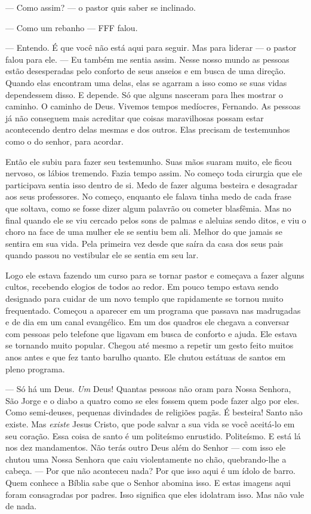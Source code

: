 --- Como assim? --- o pastor quis saber se inclinado.

--- Como um rebanho --- FFF falou.

--- Entendo. É que você não está aqui para seguir. Mas para liderar --- o pastor falou para ele. --- Eu também me sentia assim. Nesse nosso mundo as pessoas estão desesperadas pelo conforto de seus anseios e em busca de uma direção. Quando elas encontram uma delas, elas se agarram a isso como se suas vidas dependessem disso. E depende. Só que alguns nasceram para lhes mostrar o caminho. O caminho de Deus. Vivemos tempos medíocres, Fernando. As pessoas já não conseguem mais acreditar que coisas maravilhosas possam estar acontecendo dentro delas mesmas e dos outros. Elas precisam de testemunhos como o do senhor, para acordar.

Então ele subiu para fazer seu testemunho. Suas mãos suaram muito, ele ficou nervoso, os lábios tremendo. Fazia tempo  assim. No começo toda cirurgia que ele participava\mudanca{,} sentia isso dentro de si. Medo de fazer alguma besteira e desagradar aos seus professores. No começo, enquanto ele falava tinha medo de cada frase que soltava, como se fosse dizer algum palavrão ou cometer blasfêmia. Mas no final quando ele se viu cercado pelos sons de palmas e aleluias sendo ditos, e viu o choro na face de uma mulher\mudanca{,} ele se sentiu bem\mudanca{,} ali. Melhor do que jamais se sentira em sua vida. Pela primeira vez desde que saíra da casa dos seus pais\mudanca{,} quando passou no vestibular\mudanca{,} ele se sentia em seu lar.

Logo ele estava fazendo um curso para se tornar pastor e começava a fazer alguns cultos, recebendo elogios de todos ao redor. Em pouco tempo estava sendo designado para cuidar de um novo templo que rapidamente se tornou muito frequentado. Começou a aparecer em um programa que passava nas madrugadas e de dia em um canal evangélico. Em um dos quadros ele chegava a conversar com pessoas pelo telefone que ligavam em busca de conforto e ajuda. Ele estava se tornando muito popular. Chegou até mesmo a repetir um gesto feito muitos anos antes\mudanca{,} e que fez tanto barulho quanto. Ele chutou estátuas de santos em pleno programa.

--- Só há um Deus. \emph{Um} Deus! Quantas pessoas não oram para Nossa Senhora, São Jorge e o diabo a quatro como se eles fossem quem pode fazer algo por eles. Como semi-deuses, pequenas divindades de religiões pagãs. É besteira! Santo não existe. Mas \emph{existe} Jesus Cristo, que pode salvar a sua vida se você aceitá-lo em seu coração. Essa coisa de santo é um politeísmo enrustido. Politeísmo. E está lá nos dez mandamentos. Não terás outro Deus além do Senhor ---  com isso ele chutou uma Nossa Senhora que caiu violentamente no chão, quebrando-lhe a cabeça. --- Por que não aconteceu nada? Por que isso aqui é um ídolo de barro. Quem conhece a Bíblia sabe que o Senhor abomina isso. E estas imagens aqui foram consagradas por padres. Isso significa que eles idolatram isso. Mas não vale de nada.

